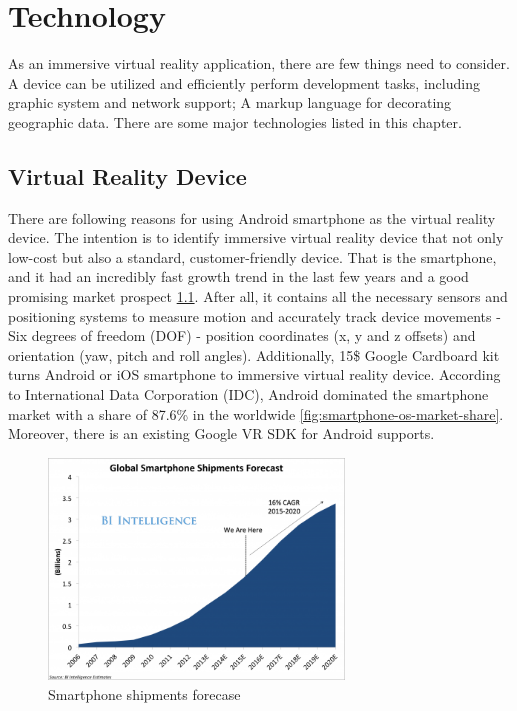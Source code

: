 \chapter{Technology}
\label{chapter-technology}

As an immersive virtual reality application, there are few things need to consider. A device can be utilized and efficiently perform development tasks, including graphic system and network support; A markup language for decorating geographic data. There are some major technologies listed in this chapter.

\section{Virtual Reality Device}

There are following reasons for using Android smartphone as the virtual reality device. The intention is to identify immersive virtual reality device that not only low-cost but also a standard, customer-friendly device. That is the smartphone, and it had an incredibly fast growth trend in the last few years and a good promising market prospect \ref{fig:smartphone-shipments-forecast}. After all, it contains all the necessary sensors and positioning systems to measure motion and accurately track device movements - Six degrees of freedom (DOF) - position coordinates (x, y and z offsets) and orientation (yaw, pitch and roll angles). Additionally, 15\$ Google Cardboard kit turns Android or iOS smartphone to immersive virtual reality device. According to International Data Corporation (IDC), Android dominated the smartphone market with a share of 87.6\% in the worldwide \ref{fig:smartphone-os-market-share}. Moreover, there is an existing Google VR SDK \cite{google.vr-sdk.2016} for Android supports.

\begin{figure}[H]
\caption[Smartphone shipments forecase]{Smartphone shipments forecase \cite{tony.smartphone-market.2015}}
\label{fig:smartphone-shipments-forecast}
\centering
\includegraphics[width=0.7\textwidth, keepaspectratio]{Figures/smartphone-shipments-forecast.png}
\decoRule
\end{figure}

